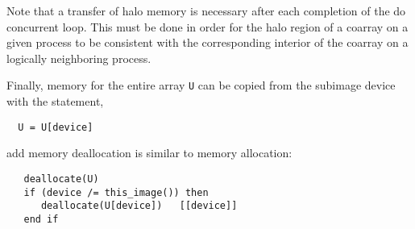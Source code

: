 Note that a transfer of halo memory is necessary after each completion of the do concurrent loop.
This must be done in order for the halo region of a coarray on a given process to be consistent
with the corresponding interior of the coarray on a logically neighboring process.


Finally, memory for the entire array \texttt{U} can be copied from the
subimage device with the statement,

\begin{verbatim}
  U = U[device]
\end{verbatim}

add memory deallocation is similar to memory allocation:

\begin{verbatim}
   deallocate(U)
   if (device /= this_image()) then
      deallocate(U[device])   [[device]]
   end if
\end{verbatim}








